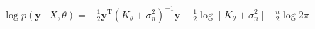 \documentclass[10pt]{article}
\begin{document}
\begin{align*}\log p(\mathbf{y} \mid X, \theta) = -\frac{1}{2} \mathbf{y}^{\text{T}} \left( K_{\theta} + \sigma_n^2 \right)^{-1}\mathbf{y} -\frac{1}{2} \log \mid K_{\theta} + \sigma_n^2 \mid -\frac{n}{2}\log 2\pi\end{align*}
\end{document}
